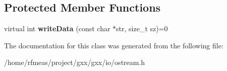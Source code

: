 \subsection*{Protected Member Functions}
\begin{DoxyCompactItemize}
\item 
virtual int {\bfseries write\+Data} (const char $\ast$str, size\+\_\+t sz)=0\hypertarget{classgxx_1_1io_1_1ostream_a5b65b75fde45c7abb3ea7a9df5af0309}{}\label{classgxx_1_1io_1_1ostream_a5b65b75fde45c7abb3ea7a9df5af0309}

\end{DoxyCompactItemize}


The documentation for this class was generated from the following file\+:\begin{DoxyCompactItemize}
\item 
/home/rfmeas/project/gxx/gxx/io/ostream.\+h\end{DoxyCompactItemize}
